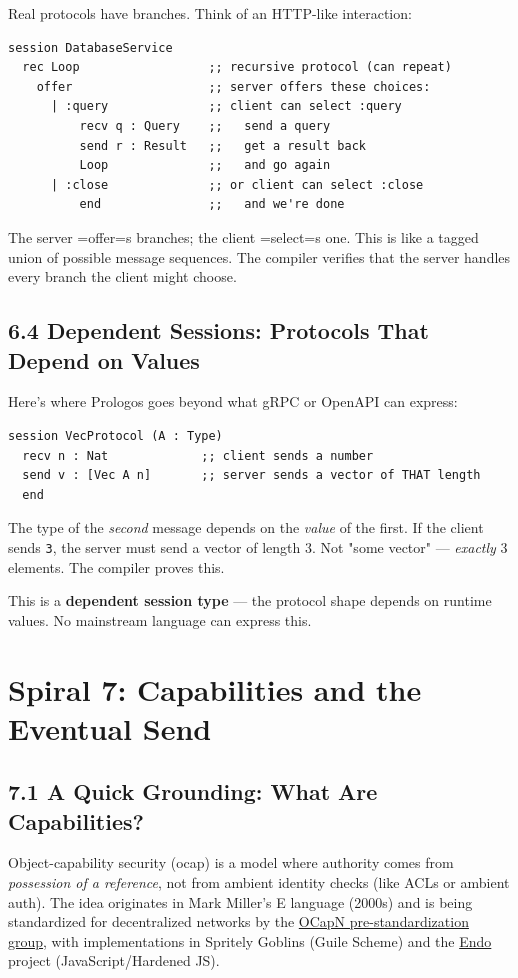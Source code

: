 \documentclass[11pt]{article}
\begin{document}
Real protocols have branches. Think of an HTTP-like interaction:

\begin{verbatim}
session DatabaseService
  rec Loop                  ;; recursive protocol (can repeat)
    offer                   ;; server offers these choices:
      | :query              ;; client can select :query
          recv q : Query    ;;   send a query
          send r : Result   ;;   get a result back
          Loop              ;;   and go again
      | :close              ;; or client can select :close
          end               ;;   and we're done
\end{verbatim}

The server =offer=s branches; the client =select=s one. This is like a
tagged union of possible message sequences. The compiler verifies that
the server handles every branch the client might choose.
\subsection{6.4 Dependent Sessions: Protocols That Depend on Values}
\label{sec:org29bbc5b}

Here's where Prologos goes beyond what gRPC or OpenAPI can express:

\begin{verbatim}
session VecProtocol (A : Type)
  recv n : Nat             ;; client sends a number
  send v : [Vec A n]       ;; server sends a vector of THAT length
  end
\end{verbatim}

The type of the \emph{second} message depends on the \emph{value} of the first.
If the client sends \texttt{3}, the server must send a vector of length 3. Not
"some vector" --- \emph{exactly} 3 elements. The compiler proves this.

This is a \textbf{dependent session type} --- the protocol shape depends on
runtime values. No mainstream language can express this.
\section{Spiral 7: Capabilities and the Eventual Send}
\label{sec:org19a462a}

\subsection{7.1 A Quick Grounding: What Are Capabilities?}
\label{sec:org86504a3}

Object-capability security (ocap) is a model where authority comes from
\emph{possession of a reference}, not from ambient identity checks (like ACLs
or ambient auth). The idea originates in Mark Miller's E language (2000s)
and is being standardized for decentralized networks by the \href{https://ocapn.org/}{OCapN
pre-standardization group}, with implementations in Spritely Goblins
(Guile Scheme) and the \href{https://github.com/endojs/endo}{Endo} project (JavaScript/Hardened JS).
\end{document}
